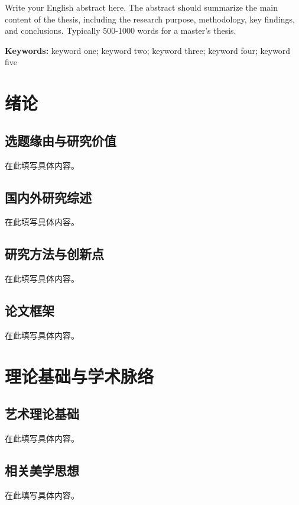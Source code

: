 \documentclass[a4paper,12pt,openright]{ctexrep}
\begin{document}
Write your English abstract here. The abstract should summarize the main content of the thesis, including the research purpose, methodology, key findings, and conclusions. Typically 500-1000 words for a master's thesis.

\vspace{1cm}
\noindent\textbf{Keywords:} keyword one; keyword two; keyword three; keyword four; keyword five

\newpage
\tableofcontents


\newpage


\chapter{绪论}
\section{选题缘由与研究价值}
在此填写具体内容。

\section{国内外研究综述}
在此填写具体内容。

\section{研究方法与创新点}
在此填写具体内容。

\section{论文框架}
在此填写具体内容。


\chapter{理论基础与学术脉络}
\section{艺术理论基础}
在此填写具体内容。

\section{相关美学思想}
在此填写具体内容。
\end{document}
